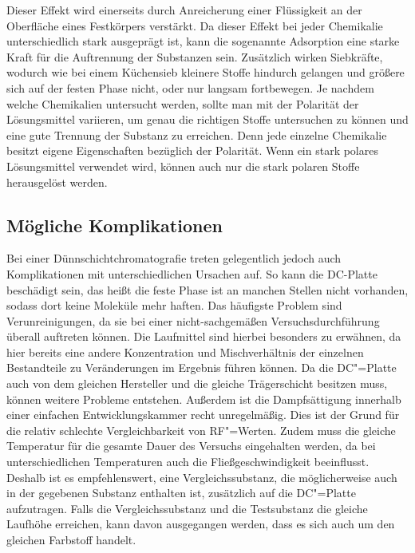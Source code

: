 \documentclass[11pt]{scrreprt}
\begin{document}
Dieser Effekt wird einerseits durch Anreicherung einer Flüssigkeit an der Oberfläche eines Festkörpers verstärkt. Da dieser Effekt bei jeder Chemikalie unterschiedlich stark ausgeprägt ist, kann die sogenannte Adsorption eine starke Kraft für die Auftrennung der Substanzen sein.
 Zusätzlich wirken Siebkräfte, wodurch wie bei einem Küchensieb kleinere Stoffe hindurch gelangen und größere  sich auf der festen Phase nicht, oder nur langsam fortbewegen.
Je nachdem welche Chemikalien untersucht werden, sollte man mit der Polarität der Lösungsmittel variieren, um genau die richtigen Stoffe untersuchen zu können und eine gute Trennung der Substanz zu erreichen. Denn jede einzelne Chemikalie besitzt eigene Eigenschaften bezüglich der Polarität. Wenn ein stark polares Lösungsmittel verwendet wird, können auch nur die stark polaren Stoffe herausgelöst werden\cite[S.8-27]{Stahl.1986}.






 

\subsection{Mögliche Komplikationen}
Bei einer Dünnschichtchromatografie treten gelegentlich jedoch auch Komplikationen mit unterschiedlichen Ursachen auf. So kann die DC-Platte beschädigt sein, das heißt die feste Phase ist an manchen Stellen nicht vorhanden, sodass dort keine Moleküle mehr haften. Das häufigste Problem sind Verunreinigungen, da sie bei einer nicht-sachgemäßen Versuchsdurchführung überall auftreten können. Die Laufmittel sind hierbei besonders zu erwähnen, da hier bereits eine andere Konzentration und Mischverhältnis der einzelnen Bestandteile zu Veränderungen im Ergebnis führen können. Da die DC"=Platte auch von dem gleichen Hersteller und die gleiche Trägerschicht besitzen muss, können weitere Probleme entstehen. Außerdem ist die Dampfsättigung innerhalb einer einfachen Entwicklungskammer recht unregelmäßig. Dies ist der Grund für die relativ schlechte Vergleichbarkeit von RF"=Werten. Zudem muss die gleiche Temperatur für die gesamte Dauer des Versuchs eingehalten werden, da bei unterschiedlichen Temperaturen auch die Fließgeschwindigkeit beeinflusst. Deshalb ist es empfehlenswert, eine Vergleichssubstanz, die möglicherweise auch in der gegebenen Substanz enthalten ist, zusätzlich auf die DC"=Platte aufzutragen.
Falls die Vergleichssubstanz und die Testsubstanz die gleiche Laufhöhe erreichen, kann davon ausgegangen werden, dass es sich auch um den gleichen Farbstoff handelt\cite[S.9]{Stahl.1986}.
\end{document}
